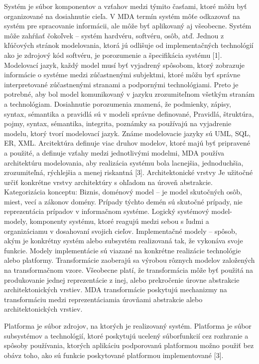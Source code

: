 \documentclass[a4paper]{feidippp}
\begin{document}
Systém  je súbor komponentov a vzťahov medzi týmito časťami, ktoré môžu byť organizované na dosiahnutie cieľa. V MDA termín systém môťe odkazovať na systém pre spracovanie informácii, ale môže byť aplikovaný aj všeobecne. Systém môže zahŕňať čokoľvek – systém hardvéru, softvéru, osôb, atď. Jednou z kľúčových stránok modelovania, ktorá jú odlišuje od implementačných technológií ako je zdrojový kód softvéru, je porozumenie a špecifikácia systému [1].
Modelovací jazyk, každý model musí byť vyjadrený spôsobom, ktorý zobrazuje informácie o systéme medzi zúčastnenými subjektmi, ktoré môžu byť správne interpretované zúčastnenými stranami a podpornými technológiami. Preto je potrebné, aby bol model komunikovaný v jazyku zrozumiteľnom všetkým stranám a technológiam. Dosiahnutie porozumenia znamená, že podmienky, zápisy, syntax, sémantika a pravidlá sú v modeli správne definované,  Pravidlá, štruktúra, pojmy, syntax, sémantika, integrita, poznámky sa používajú na vyjadrenie modelu, ktorý tvorí modelovací jazyk. Známe modelovacie jazyky sú UML, SQL, ER, XML.
Arcitektúra  definuje viac druhov modelov, ktoré majú byť pripravené a použité, a definuje vzťahy medzi jednotlivými modelmi, MDA používa architektúru modelovania, aby realizácia systému bola lacnejšia, jednoduchšia, zrozumiteľná, rýchlejšia a menej riskantná [3].
Architektonické vrstvy  
Je užitočné určiť konkrétne vrstvy architektúry s ohľadom na úroveň abstrakcie.
Kategorizácia konceptu:
Biznis, doménový model – je model skutočných osôb, miest, vecí a zákonov domény. Prípady týchto demén sú skutočné prípady, nie reprezentácia prípadov v informačnom systéme.
Logický systémový model- modely, komponenty systému, ktoré reagujú medzi sebou s ľudmi a organizáciamu v dosahovaní svojich cieľov. 
Implementačné modely – spôsob, akým je konkrétny systém alebo subsystém realizovaná tak, že vykonáva svoje funkcie. Modely implementácie sú viazané na konkrétne realizácie  technológie alebo platformy. 
Transformácie  zaoberajú sa výrobou rôznych modelov založených na transformačnom vzore. Všeobecne platí, že transformácia môže byť použitá na produkovanie jednej reprezentácie z inej, alebo prekročenie úrovne abstrakcie architektonických vrstiev. MDA transformácie poskytujú mechanizmy na transformáciu medzi reprezentáciamia úrovňami abstrakcie alebo architektonických vrstiev.

Platforma je súbor zdrojov, na ktorých je realizovaný systém. Platforma je súbor subsystémov a technológií, ktoré poskytujú ucelený súborfunkcií cez rozhranie a spôsoby používania, ktorých aplikáciu podporovanú platformou možno použiť bez obávz toho, ako sú funkcie poskytované platformou implementované [3].
\end{document}
